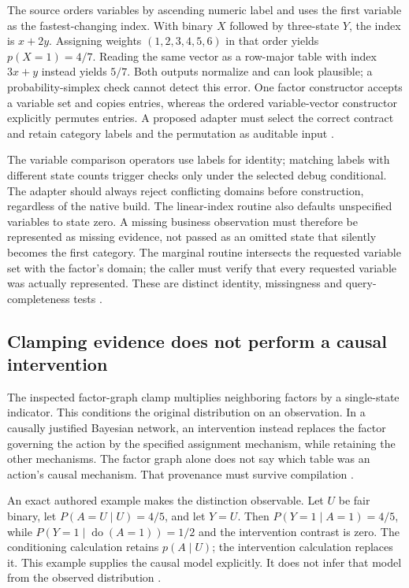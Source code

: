 The source orders variables by ascending numeric label and uses the first
variable as the fastest-changing index. With binary $X$ followed by
three-state $Y$, the index is $x+2y$. Assigning weights $(1,2,3,4,5,6)$ in
that order yields $p(X=1)=4/7$. Reading the same vector as a row-major table
with index $3x+y$ instead yields $5/7$. Both outputs normalize and can look
plausible; a probability-simplex check cannot detect this error. One factor
constructor accepts a variable set and copies entries, whereas the ordered
variable-vector constructor explicitly permutes entries. A proposed adapter
must select the correct contract and retain category labels and the
permutation as auditable input \cite{exec24_libdai_source,exec24_libdai_choice}.

The variable comparison operators use labels for identity; matching labels
with different state counts trigger checks only under the selected debug
conditional. The adapter should always reject conflicting domains before
construction, regardless of the native build. The linear-index routine also
defaults unspecified variables to state zero. A missing business observation
must therefore be represented as missing evidence, not passed as an omitted
state that silently becomes the first category. The marginal routine
intersects the requested variable set with the factor's domain; the caller
must verify that every requested variable was actually represented. These
are distinct identity, missingness and query-completeness tests
\cite{exec24_libdai_source}.

\subsection{Clamping evidence does not perform a causal intervention}
The inspected factor-graph clamp multiplies neighboring factors by a
single-state indicator. This conditions the original distribution on an
observation. In a causally justified Bayesian network, an intervention
instead replaces the factor governing the action by the specified assignment
mechanism, while retaining the other mechanisms. The factor graph alone
does not say which table was an action's causal mechanism. That provenance
must survive compilation \cite{exec24_libdai_source,exec24_libdai_choice}.

An exact authored example makes the distinction observable. Let $U$ be fair
binary, let $P(A=U\mid U)=4/5$, and let $Y=U$. Then
$P(Y=1\mid A=1)=4/5$, while
$P(Y=1\mid\operatorname{do}(A=1))=1/2$ and the intervention contrast is zero.
The conditioning calculation retains $p(A\mid U)$; the intervention
calculation replaces it. This example supplies the causal model explicitly.
It does not infer that model from the observed distribution
\cite{exec24_libdai_choice}.

